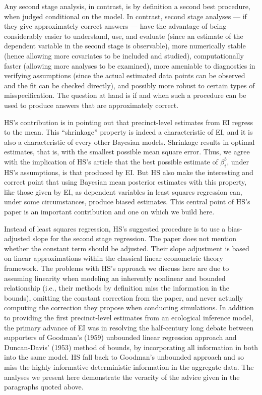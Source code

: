 \documentclass[11pt,titlepage]{article}
\begin{document}
Any second stage analysis, in contrast, is by definition a second best
procedure, when judged conditional on the model.  In contrast, second
stage analyses --- if they give approximately correct answers --- have
the advantage of being considerably easier to understand, use, and
evaluate (since an estimate of the dependent variable in the second
stage is observable), more numerically stable (hence allowing more
covariates to be included and studied), computationally faster
(allowing more analyses to be examined), more ameniable to diagnostics
in verifying assumptions (since the actual estimated data points can
be observed and the fit can be checked directly), and possibly more
robust to certain types of misspecification.  The question at hand is
if and when such a procedure can be used to produce answers that are
approximately correct.

HS's contribution is in pointing out that precinct-level estimates
from EI regress to the mean.  This ``shrinkage'' property is indeed a
characteristic of EI, and it is also a characteristic of every other
Bayesian models.  Shrinkage results in optimal estimates, that is,
with the smallest possible mean square error.  Thus, we agree with the
implication of HS's article that the best possible estimate of
$\beta^b_i$, under HS's assumptions, is that produced by EI.  But HS
also make the interesting and correct point that using Bayesian mean
posterior estimates with this property, like those given by EI, as
dependent variables in least squares regression can, under some
circumstances, produce biased estimates.  This central point of HS's
paper is an important contribution and one on which we build here.

Instead of least squares regression, HS's suggested procedure is to
use a bias-adjusted slope for the second stage regression.  The paper
does not mention whether the constant term should be adjusted.  Their
slope adjustment is based on linear approximations within the
classical linear econometric theory framework.  The problems with HS's
approach we discuss here are due to assuming linearity when modeling
an inherently nonlinear and bounded relationship (i.e., their methods
by definition miss the information in the bounds), omitting the
constant correction from the paper, and never actually computing the
correction they propose when conducting simulations.  In addition to
providing the first precinct-level estimates from an ecological
inference model, the primary advance of EI was in resolving the
half-century long debate between supporters of Goodman's (1959)
unbounded linear regression approach and Duncan-Davis' (1953) method
of bounds, by incorporating all information in both into the same
model.  HS fall back to Goodman's unbounded approach and so miss the
highly informative deterministic information in the aggregate data.
The analyses we present here demonstrate the veracity of the advice
given in the paragraphs quoted above.
\end{document}
